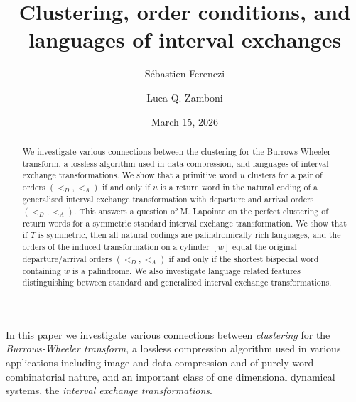 \documentclass[12pt,a4paper]{amsart}
\begin{document}
\title{Clustering, order conditions, and  languages of interval exchanges}


\author[S. Ferenczi]{S\'ebastien Ferenczi}
\address{Aix Marseille Universit\'e, CNRS, Centrale Marseille, Institut de Math\' ematiques de Marseille, I2M - UMR 7373\\13453 Marseille, France.}





\author[L.Q. Zamboni]{Luca Q. Zamboni}
\address{Institut Camille Jordan\\
Universit\'e Claude Bernard Lyon 1\\
43 boulevard du 11 novembre 1918\\
F69622 Villeurbanne Cedex
(France)}


 \date{March 15,  2026}



\begin{abstract}
We investigate various connections between the clustering for the Burrows-Wheeler transform, a lossless algorithm used in data compression, and languages of interval exchange transformations. We show that a primitive word $u$ clusters for a pair of orders $(<_D,<_A)$ if and only if $u$ is a return word in the natural coding of a generalised interval exchange transformation with departure and arrival orders $(<_D,<_A)$. This answers a question of M. Lapointe on the perfect clustering of return words for a symmetric standard interval exchange transformation. We show that if $T$ is symmetric, then all natural codings are palindromically rich languages, and the orders of the induced transformation on a cylinder $[w]$ equal the original departure/arrival orders $(<_D,<_A)$ if and only if the shortest bispecial word containing $w$ is a palindrome. We also investigate language related features distinguishing between standard and generalised interval exchange transformations.
 \end{abstract}
\maketitle

In this paper we investigate various connections between  {\it clustering} for the {\it Burrows-Wheeler transform}, a lossless compression algorithm used in various applications including image and data compression and of purely word combinatorial nature, and an important class of one dimensional dynamical systems, the {\it interval exchange transformations}. 
\end{document}
